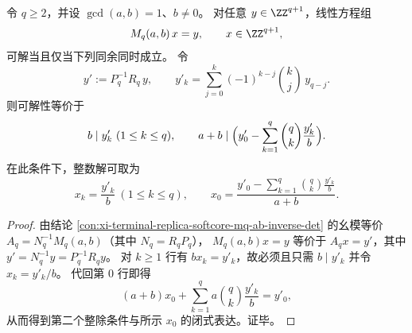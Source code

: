\begin{conclusion}[整数可解性判别的反序差分闭式]\label{con:xi-terminal-replica-softcore-mq-ab-integer-solvability}
令 \(q\ge 2\)，并设 \(\gcd(a,b)=1\)、\(b\neq 0\)。
对任意 \(y\in\ZZ^{q+1}\)，线性方程组
\[
M_q(a,b)\,x=y,\qquad x\in\ZZ^{q+1},
\]
可解当且仅当下列同余同时成立。
令
\[
y':=P_q^{-1}R_q\,y,
\qquad
y'_k=\sum_{j=0}^{k}(-1)^{k-j}\binom{k}{j}\,y_{q-j}.
\]
则可解性等价于
\[
b\mid y'_k\ (1\le k\le q),\qquad
a+b\mid\Bigl(y'_0-\sum_{k=1}^{q}\binom{q}{k}\frac{y'_k}{b}\Bigr).
\]
在此条件下，整数解可取为
\[
x_k=\frac{y'_k}{b}\ (1\le k\le q),\qquad
x_0=\frac{y'_0-\sum_{k=1}^{q}\binom{q}{k}\frac{y'_k}{b}}{a+b}.
\]
\end{conclusion}
\begin{proof}
由结论 \ref{con:xi-terminal-replica-softcore-mq-ab-inverse-det} 的幺模等价 \(A_q=N_q^{-1}M_q(a,b)\)（其中 \(N_q=R_qP_q\)），
\(
M_q(a,b)x=y
\)
等价于
\(
A_qx=y'
\)，其中 \(y'=N_q^{-1}y=P_q^{-1}R_qy\)。
对 \(k\ge 1\) 行有 \(bx_k=y'_k\)，故必须且只需 \(b\mid y'_k\) 并令 \(x_k=y'_k/b\)。
代回第 \(0\) 行即得
\[
(a+b)x_0+\sum_{k=1}^{q}a\binom{q}{k}\frac{y'_k}{b}=y'_0,
\]
从而得到第二个整除条件与所示 \(x_0\) 的闭式表达。证毕。
\end{proof}

\endinput
